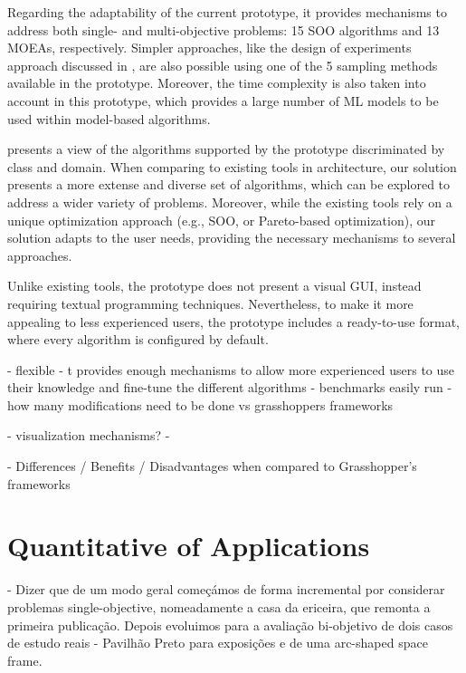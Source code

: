 Regarding the adaptability of the current prototype, it provides mechanisms to address both single- and multi-objective problems: 15 \ac{SOO} algorithms and 13 \acp{MOEA}, respectively. Simpler approaches, like the design of experiments approach discussed in , are also possible using one of the 5 sampling methods available in the prototype. Moreover, the time complexity is also taken into account in this prototype, which provides a large number of \ac{ML} models to be used within model-based algorithms.


 presents a view of the algorithms supported by the prototype discriminated by class and domain. When comparing to existing tools in architecture, our solution presents a more extense and diverse set of algorithms, which can be explored to address a wider variety of problems. Moreover, while the existing tools rely on a unique optimization approach (e.g., \ac{SOO}, or Pareto-based optimization), our solution adapts to the user needs, providing the necessary mechanisms to several approaches.

Unlike existing tools, the prototype does not present a visual \ac{GUI}, instead requiring textual programming techniques. Nevertheless, to make it more appealing to less experienced users, the prototype includes a ready-to-use format, where every algorithm is configured by default. 

- flexible - t provides enough mechanisms to allow more experienced users to use their knowledge and fine-tune the different algorithms
- benchmarks easily run - how many modifications need to be done vs grasshoppers frameworks

- visualization mechanisms?
-

- Differences / Benefits / Disadvantages when compared to Grasshopper's frameworks


\section{Quantitative of Applications}
\label{sec:quantitative}

- Dizer que de um modo geral começámos de forma incremental por considerar problemas single-objective, nomeadamente a casa da ericeira, que remonta a primeira publicação. Depois evoluimos para a avaliação bi-objetivo de dois casos de estudo reais - Pavilhão Preto para exposições e de uma arc-shaped space frame.

